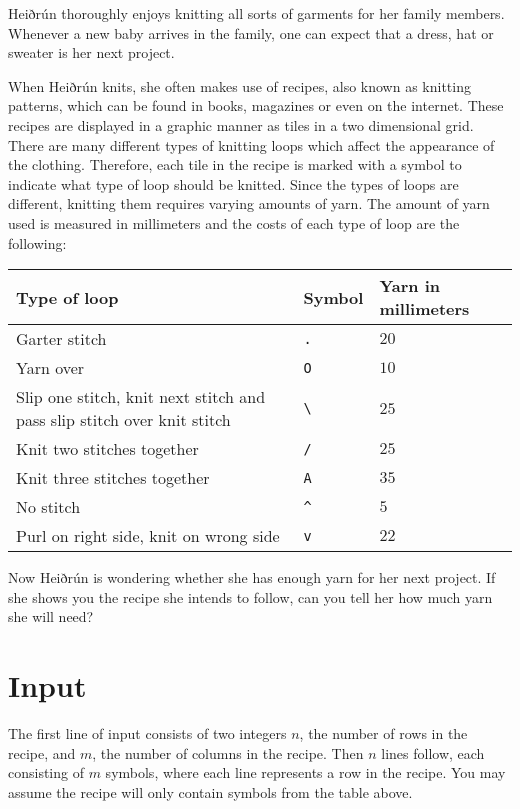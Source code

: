 
Heiðrún thoroughly enjoys knitting all sorts of garments for her family members.
Whenever a new baby arrives in the family, one can expect that a dress, hat or sweater is her next project.

When Heiðrún knits, she often makes use of recipes, also known as knitting patterns, which can be found in books, magazines or even on the internet.
These recipes are displayed in a graphic manner as tiles in a two dimensional grid.
There are many different types of knitting loops which affect the appearance of the clothing.
Therefore, each tile in the recipe is marked with a symbol to indicate what type of loop should be knitted.
Since the types of loops are different, knitting them requires varying amounts of yarn.
The amount of yarn used is measured in millimeters and the costs of each type of loop are the following:

\begin{tabular}{|l|l|l|}
    \hline
    Type of loop                        & Symbol                  & Yarn in millimeters \\ \hline
    Garter stitch & \texttt{.}              & $20$ \\ \hline
    Yarn over                           & \texttt{O}              & $10$ \\ \hline
    Slip one stitch, knit next stitch and pass slip stitch over knit stitch & \texttt{\textbackslash} & $25$ \\ \hline
    Knit two stitches together & \texttt{/}              & $25$ \\ \hline
    Knit three stitches together & \texttt{A}              & $35$ \\ \hline
    No stitch                            & \texttt{\^{}}           & $5$  \\ \hline
    Purl on right side, knit on wrong side & \texttt{v}              & $22$ \\ \hline
\end{tabular}

Now Heiðrún is wondering whether she has enough yarn for her next project.
If she shows you the recipe she intends to follow, can you tell her how much yarn she will need?

\section*{Input}
The first line of input consists of two integers $n$, the number of rows in the recipe, and $m$, the number of columns in the recipe.
Then $n$ lines follow, each consisting of $m$ symbols, where each line represents a row in the recipe.
You may assume the recipe will only contain symbols from the table above.

